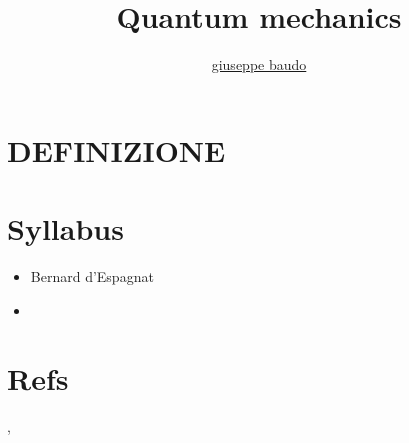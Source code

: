 \documentclass[a4paper,10pt]{article}
\title{Quantum mechanics}
\author{\href{http://www.baudo.hol.es}{giuseppe baudo}}
\begin{document}
\maketitle

\section{DEFINIZIONE}

\section{Syllabus}
\begin{itemize}
 \item Bernard d'Espagnat
 \item 
\end{itemize}

\section{Refs}
\cite{10}, \cite{11}

\end{document}
